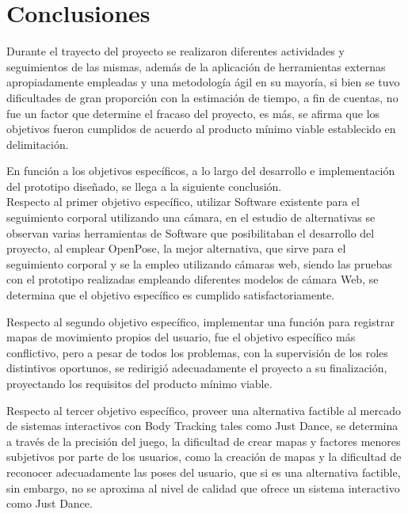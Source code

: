 \chapter{Conclusiones}


Durante el trayecto del proyecto se realizaron diferentes actividades y seguimientos de las mismas, además de la aplicación de herramientas externas apropiadamente empleadas y una metodología ágil en su mayoría, si bien se tuvo dificultades de gran proporción con la estimación de tiempo, a fin de cuentas, no fue un factor que determine el fracaso del proyecto, es más, se afirma que los objetivos fueron cumplidos de acuerdo al producto mínimo viable establecido en delimitación.

En función a los objetivos específicos, a lo largo del desarrollo e implementación del prototipo diseñado, se llega a la siguiente conclusión.
\\

Respecto al primer objetivo específico, utilizar Software existente para el seguimiento corporal utilizando una cámara, en el estudio de alternativas se observan varias herramientas de Software que posibilitaban el desarrollo del proyecto, al emplear OpenPose, la mejor alternativa, que sirve para el seguimiento corporal y se la empleo utilizando cámaras web, siendo las pruebas con el prototipo realizadas empleando diferentes modelos de cámara Web, se determina que el objetivo específico es cumplido satisfactoriamente.

Respecto al segundo objetivo específico, implementar una función para registrar mapas de movimiento propios del usuario, fue el objetivo específico más conflictivo, pero a pesar de todos los problemas, con la supervisión de los roles distintivos oportunos, se redirigió adecuadamente el proyecto a su finalización, proyectando los requisitos del producto mínimo viable.

Respecto al tercer objetivo específico, proveer una alternativa factible al mercado de sistemas interactivos con Body Tracking tales como Just Dance, se determina a través de la precisión del juego, la dificultad de crear mapas y factores menores subjetivos por parte de los usuarios, como la creación de mapas y la dificultad de reconocer adecuadamente las poses del usuario, que si es una alternativa factible, sin embargo, no se aproxima al nivel de calidad que ofrece un sistema interactivo como Just Dance. 

